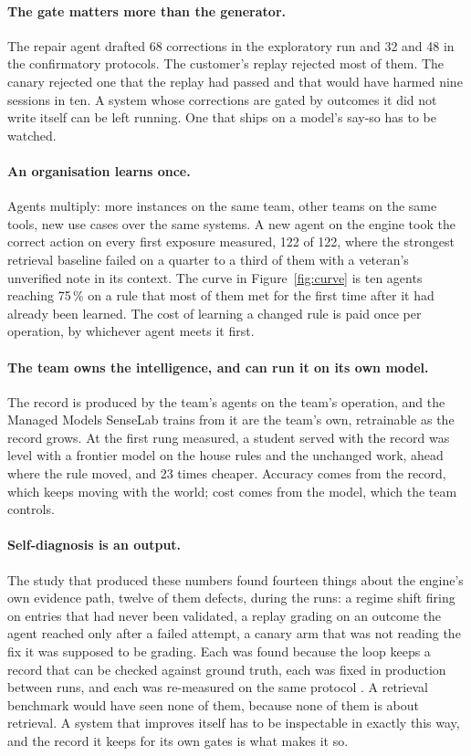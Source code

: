 \documentclass[11pt]{article}
\begin{document}
\paragraph{The gate matters more than the generator.} The repair agent drafted 68 corrections in
the exploratory run and 32 and 48 in the confirmatory protocols. The customer's replay rejected
most of them. The canary rejected one that the replay had passed and that would have harmed
nine sessions in ten. A system whose corrections are gated by outcomes it did not write itself
can be left running. One that ships on a model's say-so has to be watched.

\paragraph{An organisation learns once.} Agents multiply: more instances on the same team,
other teams on the same tools, new use cases over the same systems. A new agent on the engine
took the correct action on every first exposure measured, 122 of 122, where the strongest
retrieval baseline failed on a quarter to a third of them with a veteran's unverified note in
its context. The curve in Figure~\ref{fig:curve} is ten agents reaching 75\,\% on a rule that
most of them met for the first time after it had already been learned. The cost of learning a
changed rule is paid once per operation, by whichever agent meets it first.

\paragraph{The team owns the intelligence, and can run it on its own model.} The record is
produced by the team's agents on the team's operation, and the Managed Models SenseLab trains
from it are the team's own, retrainable as the record grows. At the first rung measured, a
student served with the record was level with a frontier model on the house rules and the
unchanged work, ahead where the rule moved, and 23 times cheaper. Accuracy comes from the
record, which keeps moving with the world; cost comes from the model, which the team controls.

\paragraph{Self-diagnosis is an output.} The study that produced these numbers found fourteen
things about the engine's own evidence path, twelve of them defects, during the runs: a regime
shift firing on entries that had never been validated, a replay grading on an outcome the agent
reached only after a failed attempt, a canary arm that was not reading the fix it was supposed
to be grading. Each was found because the loop keeps a record that can be checked against ground
truth, each was fixed in production between runs, and each was re-measured on the same
protocol \cite{rsi-paper}. A retrieval benchmark would have seen none of them, because none of
them is about retrieval. A system that improves itself has to be inspectable in exactly this way,
and the record it keeps for its own gates is what makes it so.
\end{document}

